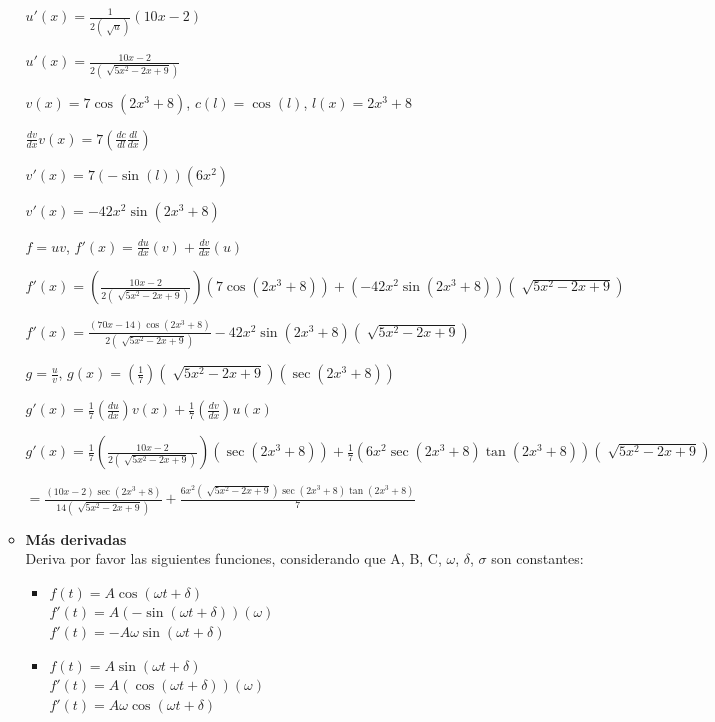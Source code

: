 \documentclass[10pt, a4paper]{article}
\begin{document}
\begin{enumerate}
\begin{itemize}
\begin{center}
                    $u'(x)=\frac{1}{2(\sqrt[]{a})}(10x-2)$

                    $u'(x)=\frac{10x-2}{2(\sqrt[]{5x^2-2x+9})}$

                    $v(x) = 7\cos(2x^3 + 8)$, $c(l)=\cos(l)$, $l(x)=2x^3 + 8$

                    $\frac{dv}{dx}v(x)=7(\frac{dc}{dl}\frac{dl}{dx})$
                    
                    $v'(x)=7(-\sin(l))(6x^2)$

                    $v'(x)=-42x^2\sin(2x^3 + 8)$

                    $f = uv$, $f'(x)= \frac{du}{dx}(v) + \frac{dv}{dx}(u)$

                    $f'(x)=(\frac{10x-2}{2(\sqrt[]{5x^2-2x+9})})(7\cos(2x^3 + 8))+(-42x^2\sin(2x^3 + 8))(\sqrt[]{5x^2-2x+9})$

                    $f'(x)=\frac{(70x-14)\cos(2x^3 + 8)}{2(\sqrt[]{5x^2-2x+9})}-42x^2\sin(2x^3 + 8)(\sqrt[]{5x^2-2x+9})$

                    $g=\frac{u}{v}$, $g(x)=(\frac{1}{7})(\sqrt[]{5x^2-2x+9})(\sec(2x^3 + 8))$

                    $g'(x)=\frac{1}{7}(\frac{du}{dx})v(x)+\frac{1}{7}(\frac{dv}{dx})u(x)$

                    $g'(x)=\frac{1}{7}(\frac{10x-2}{2(\sqrt[]{5x^2-2x+9})})(\sec(2x^3 + 8))+\frac{1}{7}(6x^2\sec(2x^3 + 8)\tan(2x^3 + 8))(\sqrt[]{5x^2-2x+9})$

                    $=\frac{(10x-2)\sec(2x^3 + 8)}{14(\sqrt[]{5x^2-2x+9})}+\frac{6x^2(\sqrt[]{5x^2-2x+9})\sec(2x^3 + 8)\tan(2x^3 + 8)}{7}$
                    
                \end{center}

                \item \textbf{Más derivadas} \\
                Deriva por favor las siguientes funciones, considerando que
                A, B, C, $\omega$, $\delta$, $\sigma$ son constantes:

                \begin{itemize}
                    \item$f(t) = A\cos(\omega t + \delta)$\\
                    $f'(t)=A(-\sin(\omega t + \delta))(\omega)$\\
                    $f'(t)=-A\omega \sin(\omega t + \delta)$

                    \item$f(t) = A\sin(\omega t + \delta)$\\
                    $f'(t)=A(\cos(\omega t + \delta))(\omega)$\\
                    $f'(t)=A\omega \cos(\omega t + \delta)$


\end{itemize}
\end{itemize}
\end{enumerate}
\end{document}
